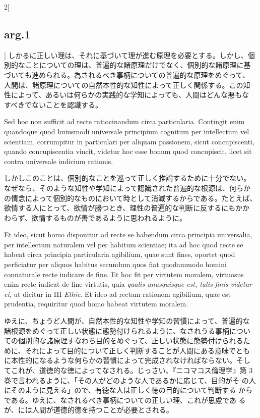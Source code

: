 \documentclass[paper=a4paper,fontsize=10pt,jafontsize=9pt,titlepage]{jlreq}
\begin{document}
\begin{paracol}{2}[\subsection{arg.1}]
しかるに正しい理は、それに基づいて理が進む原理を必要とする。しかし、個
別的なことについての理は、普遍的な諸原理だけでなく、個別的な諸原理に基
づいても進められる。為されるべき事柄についての普遍的な原理をめぐって、
人間は、諸原理についての自然本性的な知性によって正しく関係する。この知
性によって、あるいは何らかの実践的な学知によっても、人間はどんな悪もな
すべきでないことを認識する。

\switchcolumn*

Sed hoc non sufficit ad recte ratiocinandum circa
particularia. Contingit enim quandoque quod huiusmodi universale
principium cognitum per intellectum vel scientiam, corrumpitur in
particulari per aliquam passionem, sicut concupiscenti, quando
concupiscentia vincit, videtur hoc esse bonum quod concupiscit, licet
sit contra universale iudicium rationis.

\switchcolumn

しかしこのことは、個別的なことを巡って正しく推論するために十分でない。
なぜなら、そのような知性や学知によって認識された普遍的な根源は、何らか
の情念によって個別的なものにおいて時として消滅するからである。たとえば、
欲情する人にとって、欲情が勝つとき、理性の普遍的な判断に反するにもかか
わらず、欲情するものが善であるように思われるように。

\switchcolumn*

Et ideo, sicut homo disponitur ad recte se habendum circa principia
universalia, per intellectum naturalem vel per habitum scientiae; ita
ad hoc quod recte se habeat circa principia particularia agibilium,
quae sunt fines, oportet quod perficiatur per aliquos habitus secundum
quos fiat quodammodo homini connaturale recte iudicare de fine. Et hoc
fit per virtutem moralem, virtuosus enim recte iudicat de fine
virtutis, quia {\itshape qualis unusquisque est, talis finis videtur
ei}, ut dicitur in III {\itshape Ethic}. Et ideo ad rectam rationem
agibilium, quae est prudentia, requiritur quod homo habeat virtutem
moralem.

\switchcolumn

ゆえに、ちょうど人間が、自然本性的な知性や学知の習慣によって、普遍的な
諸根源をめぐって正しい状態に態勢付けられるように、なされうる事柄につい
ての個別的な諸原理すなわち目的をめぐって、正しい状態に態勢付けられるた
めに、それによって目的について正しく判断することが人間にある意味でとも
に本性的になるような何らかの習慣によって完成されなければならない。そし
てこれが、道徳的な徳によってなされる。じっさい、『ニコマコス倫理学』第
3巻で言われるように、「その人がどのような人であるかに応じて、目的がそ
の人にそのように見える」ので、有徳な人は正しく徳の目的について判断する
からである。ゆえに、なされるべき事柄についての正しい理、これが思慮であ
るが、には人間が道徳的徳を持つことが必要とされる。


\end{paracol}
\end{document}
